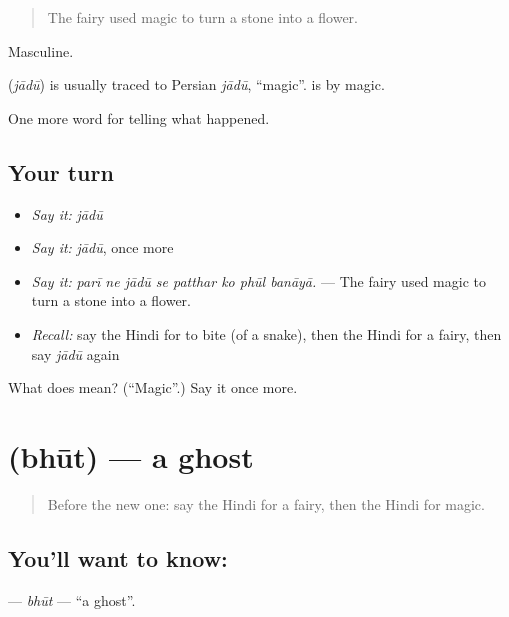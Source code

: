 \begin{quote}
The fairy used magic to turn a stone into a flower.
\end{quote}

Masculine.

\begin{cousinweb}
\textbf{} (\emph{jādū}) is usually traced to Persian \emph{jādū}, \textquotedblleft{}magic\textquotedblright{}. \textbf{ } is by magic.
\end{cousinweb}

\begin{grammarlens}[title={What you've built}]
One more word for telling what happened.
\end{grammarlens}

\subsection*{Your turn}
\begin{itemize}
\raggedright
  \item \emph{Say it:} \emph{jādū}
  \item \emph{Say it:} \emph{jādū}, once more
  \item \emph{Say it:} \emph{parī ne jādū se patthar ko phūl banāyā.} — The fairy used magic to turn a stone into a flower.
  \item \emph{Recall:} say the Hindi for to bite (of a snake), then the Hindi for a fairy, then say \emph{jādū} again
\end{itemize}

\begin{tcolorbox}[breakable,colback=teal!4,colframe=teal!35!black,title={Before you move on}]
What does  mean? (\textquotedblleft{}Magic\textquotedblright{}.) Say it once more.
\end{tcolorbox}
\section[\texorpdfstring{\hi{भूत} (bhūt)}{भूत (bhūt)}]{ (bhūt) — a ghost}

\label{lesson:HI-C338-bhut}



\begin{quote}
Before the new one: say the Hindi for a fairy, then the Hindi for magic.
\end{quote}

\subsection*{You'll want to know: }
\textbf{} — \emph{bhūt} — \textquotedblleft{}a ghost\textquotedblright{}.

